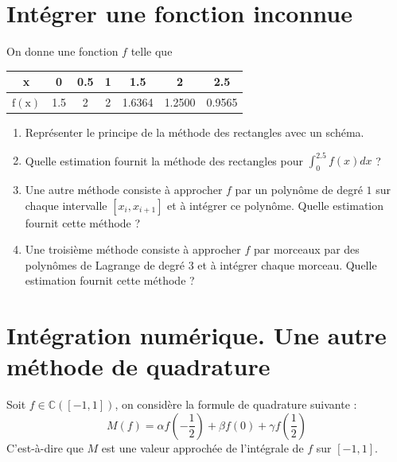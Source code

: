 \documentclass[10pt]{article}
\begin{document}
\section*{Intégrer une fonction inconnue}
On donne une fonction $f$ telle que 
\begin{center}
\begin{tabular}{|c|c|c|c|c|c|c|}
    \hline x & 0 & 0.5 & 1 & 1.5 & 2 & 2.5 \\
    \hline $\mathrm{f}(\mathrm{x})$ & 1.5 & 2 & 2 & 1.6364 & 1.2500 & 0.9565 \\
    \hline
    \end{tabular}
\end{center}
\begin{enumerate}
    \item Représenter le principe de la méthode des rectangles avec un schéma. 
    \item Quelle estimation fournit la méthode des rectangles pour $\int_0^{2.5} f(x) dx$ ?
    \item Une autre méthode consiste à approcher $f$ par un polynôme de degré $1$ sur chaque intervalle $[x_i, x_{i+1}]$ et à intégrer ce polynôme. Quelle estimation fournit cette méthode ?
    \item Une troisième méthode consiste à approcher $f$ par morceaux par des polynômes de Lagrange de degré $3$ et à intégrer chaque morceau. Quelle estimation fournit cette méthode ?
\end{enumerate}

\vspace{1cm}
\section*{Intégration numérique. Une autre méthode de quadrature}
Soit $f \in \mathbb{C}([-1,1])$, on considère la formule de quadrature suivante :
$$
M(f)=\alpha f\left(-\frac{1}{2}\right)+\beta f(0)+\gamma f\left(\frac{1}{2}\right)
$$
C'est-à-dire que $M$ est une valeur approchée de l'intégrale de $f$ sur $[-1,1]$.
\end{document}
